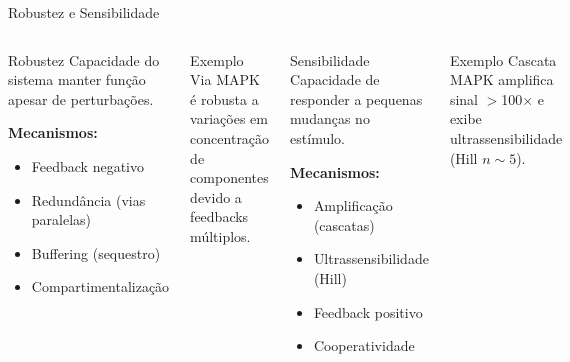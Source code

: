 \begin{frame}{Robustez e Sensibilidade}
\begin{columns}
\begin{block}{Robustez}
Capacidade do sistema manter função apesar de perturbações.

\vspace{0.2cm}

\textbf{Mecanismos:}
\begin{itemize}
    \item Feedback negativo
    \item Redundância (vias paralelas)
    \item Buffering (sequestro)
    \item Compartimentalização
\end{itemize}
\end{block}

\begin{exampleblock}{Exemplo}
Via MAPK é robusta a variações em concentração de componentes devido a feedbacks múltiplos.
\end{exampleblock}

\begin{block}{Sensibilidade}
Capacidade de responder a pequenas mudanças no estímulo.

\vspace{0.2cm}

\textbf{Mecanismos:}
\begin{itemize}
    \item Amplificação (cascatas)
    \item Ultrassensibilidade (Hill)
    \item Feedback positivo
    \item Cooperatividade
\end{itemize}
\end{block}

\begin{exampleblock}{Exemplo}
Cascata MAPK amplifica sinal $>$100$\times$ e exibe ultrassensibilidade (Hill $n \sim 5$).
\end{exampleblock}
\end{columns}

\vspace{0.3cm}

\end{frame}

